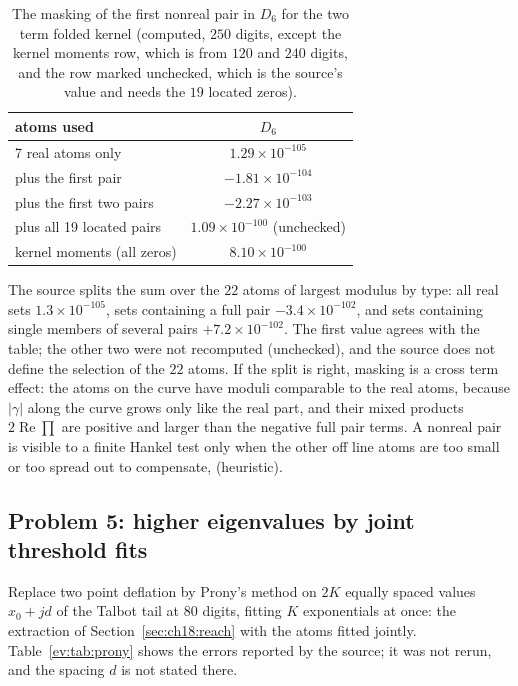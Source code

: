 \begin{table}[h]\centering\small
\begin{tabular}{lc}
\toprule
atoms used & $D_6$\\
\midrule
7 real atoms only & $1.29\times10^{-105}$\\
plus the first pair & $-1.81\times10^{-104}$\\
plus the first two pairs & $-2.27\times10^{-103}$\\
plus all 19 located pairs & $1.09\times10^{-100}$ (unchecked)\\
kernel moments (all zeros) & $8.10\times10^{-100}$\\
\bottomrule
\end{tabular}
\caption{The masking of the first nonreal pair in $D_6$ for the two term folded kernel (computed, $250$ digits, except the kernel moments row, which is from $120$ and $240$ digits, and the row marked unchecked, which is the source's value and needs the $19$ located zeros).}\label{ev:tab:mask}
\end{table}

The source splits the sum over the $22$ atoms of largest modulus by type: all real sets $1.3\times10^{-105}$, sets containing a full pair $-3.4\times10^{-102}$, and sets containing single members of several pairs $+7.2\times10^{-102}$. The first value agrees with the table; the other two were not recomputed (unchecked), and the source does not define the selection of the $22$ atoms. If the split is right, masking is a cross term effect: the atoms on the curve have moduli comparable to the real atoms, because $|\gamma|$ along the curve grows only like the real part, and their mixed products $2\operatorname{Re}\prod$ are positive and larger than the negative full pair terms. A nonreal pair is visible to a finite Hankel test only when the other off line atoms are too small or too spread out to compensate, (heuristic).

\subsection{Problem 5: higher eigenvalues by joint threshold fits}

Replace two point deflation by Prony's method on $2K$ equally spaced values $x_0+jd$ of the Talbot tail at 80 digits, fitting $K$ exponentials at once: the extraction of Section~\ref{sec:ch18:reach} with the atoms fitted jointly. Table~\ref{ev:tab:prony} shows the errors reported by the source; it was not rerun, and the spacing $d$ is not stated there.

